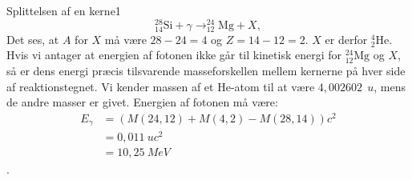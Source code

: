 \begin{opgave}{Splittelsen af en kerne}{1}
\begin{equation*}
^{28}_{14} \text{Si} + \gamma \rightarrow ^{24}_{12}\text{Mg} + X,
\end{equation*}
\opg Det ses, at $A$ for $X$ må være $28-24=4$ og $Z=14-12=2$. $X$ er derfor $^{4}_{2} \text{He}$.
\opg Hvis vi antager at energien af fotonen ikke går til kinetisk energi for $^{24}_{12}\text{Mg}$ og $X$, så er dens energi præcis tilsvarende masseforskellen mellem kernerne på hver side af reaktionstegnet. Vi kender massen af et He-atom til at være $4,002602~\SI{}{u}$, mens de andre masser er givet. Energien af fotonen må være:
\begin{align*}
E_\gamma &= (M(24,12)+M(4,2)-M(28,14))c^2 \\
&=0,011~\si{u}c^2 \\
&=10,25~\si{MeV}
\end{align*}
.
\end{opgave}


